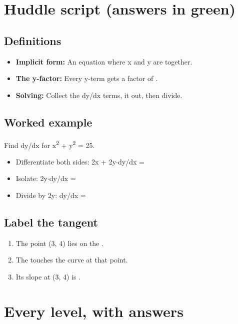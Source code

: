 \documentclass[11pt]{article}
\begin{document}
\section*{Huddle script (answers in green)}
\subsection*{Definitions}\begin{itemize}
\item \textbf{Implicit form:} An equation where x and y are  together.
\item \textbf{The y-factor:} Every y-term gets a factor of .
\item \textbf{Solving:} Collect the dy/dx terms,  it out, then divide.
\end{itemize}
\subsection*{Worked example}
Find dy/dx for x\textsuperscript{2} + y\textsuperscript{2} = 25.\\
\begin{itemize}
\item Differentiate both sides: 2x + 2y$\cdot$dy/dx = 
\item Isolate: 2y$\cdot$dy/dx = 
\item Divide by 2y: dy/dx = 
\end{itemize}
\subsection*{Label the tangent}
\begin{enumerate}
\item The point (3, 4) lies on the .
\item The  touches the curve at that point.
\item Its slope at (3, 4) is .
\end{enumerate}
\section*{Every level, with answers}
\end{document}
